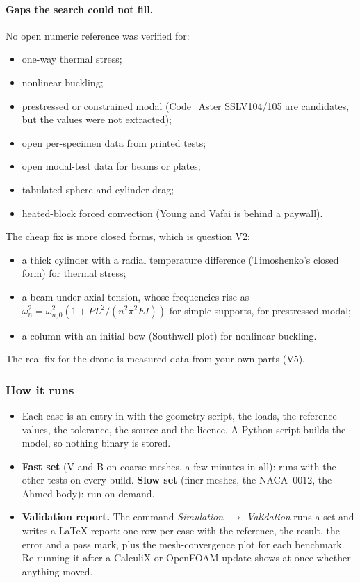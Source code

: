 \paragraph{Gaps the search could not fill.} No open numeric reference was verified for:
\begin{itemize}[nosep]
  \item one-way thermal stress;
  \item nonlinear buckling;
  \item prestressed or constrained modal (Code\_Aster SSLV104/105 are candidates, but the values were not
        extracted);
  \item open per-specimen data from printed tests;
  \item open modal-test data for beams or plates;
  \item tabulated sphere and cylinder drag;
  \item heated-block forced convection (Young and Vafai is behind a paywall).
\end{itemize}
The cheap fix is more closed forms, which is question V2:
\begin{itemize}[nosep]
  \item a thick cylinder with a radial temperature difference (Timoshenko's closed form) for thermal stress;
  \item a beam under axial tension, whose frequencies rise as $\omega_n^2=\omega_{n,0}^2(1+PL^2/(n^2\pi^2EI))$
        for simple supports, for prestressed modal;
  \item a column with an initial bow (Southwell plot) for nonlinear buckling.
\end{itemize}
The real fix for the drone is measured data from your own parts (V5).

\subsubsection*{How it runs}

\begin{itemize}[nosep]
  \item Each case is an entry in  with the geometry script, the loads, the reference
        values, the tolerance, the source and the licence. A Python script builds the model, so nothing binary
        is stored.
  \item \textbf{Fast set} (V and B on coarse meshes, a few minutes in all): runs with the other tests on every build.
        \textbf{Slow set} (finer meshes, the NACA~0012, the Ahmed body): run on demand.
  \item \textbf{Validation report.} The command \emph{Simulation~$\rightarrow$ Validation} runs a set and writes a
        \LaTeX{} report: one row per case with the reference, the result, the error and a pass mark, plus the
        mesh-convergence plot for each benchmark. Re-running it after a CalculiX or OpenFOAM update shows at once
        whether anything moved.
\end{itemize}

